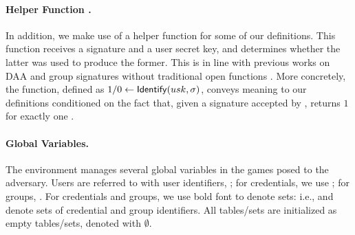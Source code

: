 \paragraph{Helper Function \Identify.} %
 In addition, we make use of a helper
function \Identify for some of our definitions. This function receives
a signature and a user secret key, and determines whether the latter was used
to produce the former. This is in line with previous works on DAA
\cite{bfg+11,cdl16} and group signatures without traditional open functions
\cite{dl21,fgl21,gl19}. More concretely, the \Identify function, defined as $1/0
\gets \mathsf{Identify}(usk,\sigma)$, conveys meaning to our definitions conditioned on
the fact that, given a signature \sig accepted by \Verify, \Identify returns $1$
for exactly one \usk.

\paragraph{Global Variables.} %
The environment manages several global variables in the games posed to the
adversary. Users are referred to with user identifiers, \uid; for credentials,
we use \cid; for groups, \gid. For credentials and groups, we use bold font to
denote sets: i.e., \scid and \sgid denote sets of credential and group
identifiers. All tables/sets are initialized as empty tables/sets, denoted
with $\emptyset$.

